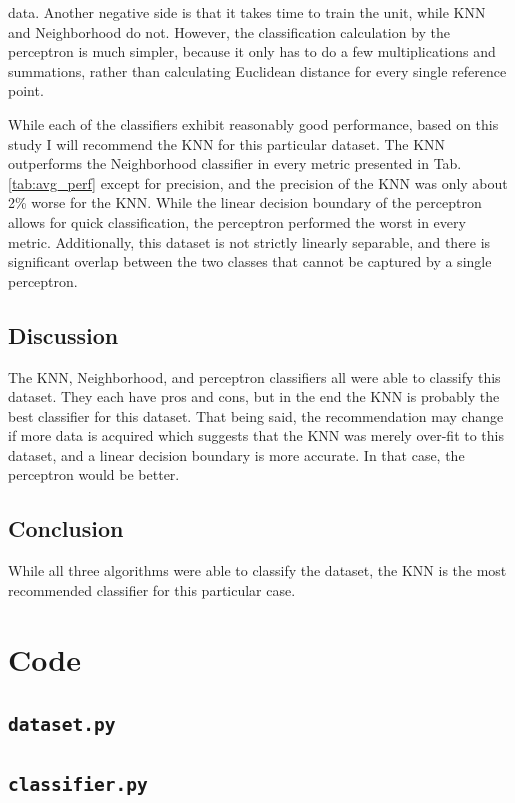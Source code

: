 \documentclass[a4paper, 11pt, titlepage]{article}
\newcommand{\tabRef}[1]{Tab. \ref{#1}}
\begin{document}
  data.
  Another negative side is that it takes time to train the unit, while KNN and
  Neighborhood do not.
  However, the classification calculation by the perceptron is much simpler,
  because it only has to do a few multiplications and summations, rather than
  calculating Euclidean distance for every single reference point.
  \par While each of the classifiers exhibit reasonably good performance, based
  on this study I will recommend the KNN for this particular dataset.
  The KNN outperforms the Neighborhood classifier in every metric presented in
  \tabRef{tab:avg_perf} except for precision, and the precision of the KNN was
  only about 2\% worse for the KNN.
  While the linear decision boundary of the perceptron allows for quick
  classification, the perceptron performed the worst in every metric.
  Additionally, this dataset is not strictly linearly separable, and there is
  significant overlap between the two classes that cannot be captured by a
  single perceptron.
  \subsection{Discussion}
  \par The KNN, Neighborhood, and perceptron classifiers all were able to
  classify this dataset.
  They each have pros and cons, but in the end the KNN is probably the best
  classifier for this dataset.
  That being said, the recommendation may change if more data is acquired which
  suggests that the KNN was merely over-fit to this dataset, and a linear
  decision boundary is more accurate.
  In that case, the perceptron would be better.
  \subsection{Conclusion}
  \par While all three algorithms were able to classify the dataset, the KNN is
  the most recommended classifier for this particular case.
  \pagebreak
  \appendix
  \section{Code}
  \subsection{\texttt{dataset.py}}
  
  \subsection{\texttt{classifier.py}}
  
\end{document}
